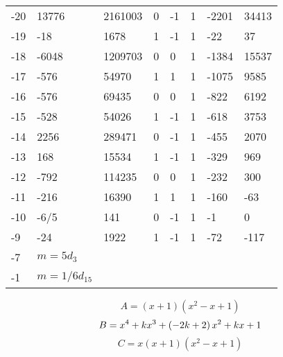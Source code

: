 \documentclass{amsart}
\begin{document}
\begin{longtable}{|l|l|l|lllll|}
-20&13776&2161003&0&-1&1&-2201&34413\\
-19&-18&1678&1&-1&1&-22&37\\
-18&-6048&1209703&0&0&1&-1384&15537\\
-17&-576&54970&1&1&1&-1075&9585\\
-16&-576&69435&0&0&1&-822&6192\\
-15&-528&54026&1&-1&1&-618&3753\\
-14&2256&289471&0&-1&1&-455&2070\\
-13&168&15534&1&-1&1&-329&969\\
-12&-792&114235&0&0&1&-232&300\\
-11&-216&16390&1&1&1&-160&-63\\
-10&-6/5&141&0&-1&1&-1&0\\
-9&-24&1922&1&-1&1&-72&-117\\
-7&$m=5d_{3}$&&\multicolumn{5}{c|}{}\\
-1&$m=1/6d_{15}$&&\multicolumn{5}{c|}{}\\
\hline
\end{longtable}
$$A=(x
 + 1)(x^2
 - x
 + 1)$$
$$B=x^4
 + k\*x^3
 + \left(-2\*k
 + 2\right) \*x^2
 + k\*x
 + 1$$
$$C=x(x
 + 1)(x^2
 - x
 + 1)$$
\end{document}
